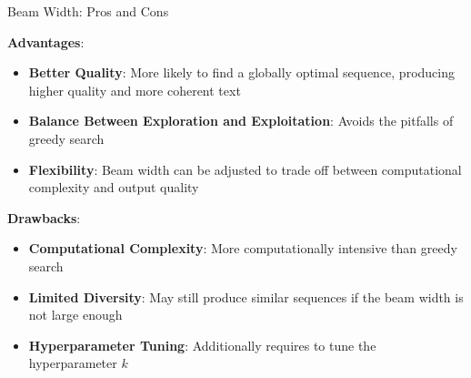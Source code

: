 \begin{vbframe}{Beam Width: Pros and Cons}

\vfill

\textbf{Advantages}:
\begin{itemize}
    \item \textbf{Better Quality}: More likely to find a globally optimal sequence, producing higher quality and more coherent text
    \item \textbf{Balance Between Exploration and Exploitation}: Avoids the pitfalls of greedy search
    \item \textbf{Flexibility}: Beam width can be adjusted to trade off between computational complexity and output quality
\end{itemize}

\textbf{Drawbacks}:
\begin{itemize}
    \item \textbf{Computational Complexity}: More computationally intensive than greedy search
    \item \textbf{Limited Diversity}: May still produce similar sequences if the beam width is not large enough
    \item \textbf{Hyperparameter Tuning}: Additionally requires to tune the hyperparameter $k$ 
\end{itemize}

\vfill
    
\end{vbframe}


\endlecture
